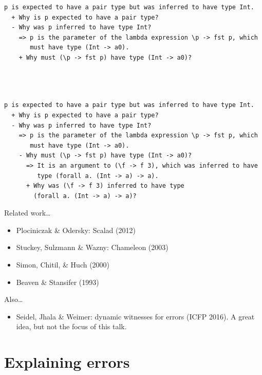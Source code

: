 \documentclass[xcolor=svgnames,12pt,aspectratio=169]{beamer}
\newenvironment{xframe}[1][]
  {\begin{frame}[fragile,environment=xframe,#1]}
  {\end{frame}}
\begin{document}
\begin{xframe}{}
  \small
\begin{Verbatim}
p is expected to have a pair type but was inferred to have type Int.
  + Why is p expected to have a pair type?
  - Why was p inferred to have type Int?
    => p is the parameter of the lambda expression \p -> fst p, which
       must have type (Int -> a0).
    + Why must (\p -> fst p) have type (Int -> a0)?




\end{Verbatim}
\end{xframe}

\begin{xframe}{}
  \small
\begin{Verbatim}
p is expected to have a pair type but was inferred to have type Int.
  + Why is p expected to have a pair type?
  - Why was p inferred to have type Int?
    => p is the parameter of the lambda expression \p -> fst p, which
       must have type (Int -> a0).
    - Why must (\p -> fst p) have type (Int -> a0)?
      => It is an argument to (\f -> f 3), which was inferred to have
         type (forall a. (Int -> a) -> a).
      + Why was (\f -> f 3) inferred to have type
        (forall a. (Int -> a) -> a)?
\end{Verbatim}
\end{xframe}

\begin{xframe}{Related work\dots}
  \begin{itemize}
  \item Plociniczak \& Odersky: Scalad (2012)
  \item Stuckey, Sulzmann \& Wazny: Chameleon (2003)
  \item Simon, Chitil, \& Huch (2000)
  \item Beaven \& Stansifer (1993)
  \end{itemize}

  Also\dots
  \begin{itemize}
  \item Seidel, Jhala \& Weimer: dynamic witnesses for errors
    (ICFP 2016). A great idea, but not the focus of this talk.
  \end{itemize}
\end{xframe}
\section{Explaining errors}
\end{document}
